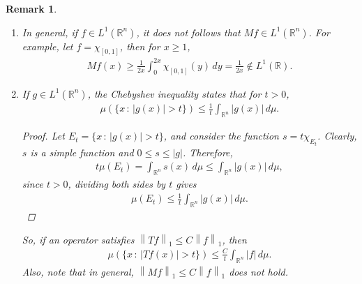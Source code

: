 \documentclass[11pt]{book}
\newtheorem{remark}{Remark}[chapter]
\theoremstyle{definition}
\numberwithin{equation}{chapter}
\begin{document}
\begin{remark}
~\begin{enumerate}[label=(\alph*)]
    \item In general, if $f \in L^1(\mathbb{R}^n)$, it does not follows that $Mf \in L^1(\mathbb{R}^n)$. For example, let $f = \chi_{[0,1]}$, then for $x \geq 1$,
    \begin{align*}
        Mf(x) \geq \frac{1}{2x} \int^{2x}_0 \chi_{[0,1]}(y) \,dy = \frac{1}{2x} \notin L^1(\mathbb{R}).
    \end{align*}
    
    \item If $g \in L^1(\mathbb{R}^n)$, the Chebyshev inequality states that for $t > 0$,
    \begin{align*}
        \mu(\{x \,:\, \left|g(x)\right| > t\}) \leq \frac{1}{t} \int_{\mathbb{R}^n} \left|g(x)\right|\,d\mu.
    \end{align*}
    \begin{proof}
    Let $E_t = \{x \,:\, \left|g(x)\right| > t\}$, and consider the function $s = t \chi_{E_t}$. Clearly, $s$ is a simple function and $0 \leq s \leq \left|g\right|$. Therefore,
    \begin{align*}
        t \mu(E_t) = \int_{\mathbb{R}^n} s(x)\,d\mu \leq \int_{\mathbb{R}^n} \left|g(x)\right|\,d\mu,
    \end{align*}
    since $t > 0$, dividing both sides by $t$ gives
    \begin{align*}
        \mu(E_t) \leq \frac{1}{t} \int_{\mathbb{R}^n} \left|g(x)\right|\,d\mu.
    \end{align*}
    \end{proof}
    
    So, if an operator satisfies $\left\|Tf\right\|_1 \leq C\left\|f\right\|_1$, then 
    \begin{align*}
        \mu(\{x \,:\, \left|Tf(x)\right| > t\}) \leq \frac{C}{t} \int_{\mathbb{R}^n} \left|f\right|\,d\mu.
    \end{align*}
    Also, note that in general, $\left\|Mf\right\|_1 \leq C\left\|f\right\|_1$ does not hold.
\end{enumerate}
\end{remark}

\medskip
\end{document}
